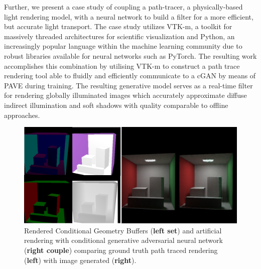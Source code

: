 Further, we present a case study of coupling a path-tracer, a physically-based light rendering model, with a neural network to build a filter for a more efficient, but accurate light transport. The case study utilizes VTK-m, a toolkit for massively threaded architectures for scientific visualization and Python, an increasingly popular language within the machine learning community due to robust libraries available for neural networks such as PyTorch. The resulting work accomplishes this combination by utilising VTK-m to construct a path trace rendering tool able to fluidly and efficiently communicate to a cGAN by means of PAVE during training.   The resulting generative model serves as a real-time filter for rendering globally illuminated images which accurately approximate diffuse indirect illumination and soft shadows with quality comparable to offline approaches. 

\begin{figure}
    \includegraphics[width=\linewidth]{Teaser.png}
    \caption{Rendered Conditional Geometry Buffers ({\bf left set}) and artificial rendering with conditional generative adversarial neural network ({\bf right couple}) comparing ground truth path traced rendering ({\bf left}) with image generated ({\bf right}).}
    \label{teaser}
  \end{figure}
